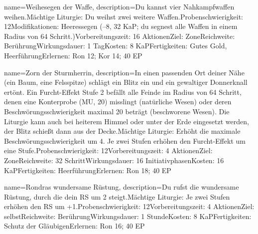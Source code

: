 {
    name={Weihesegen der Waffe},
    description={Du kannst vier Nahkampfwaffen weihen.\newline Mächtige Liturgie: Du weihst zwei weitere Waffen.\newline Probenschwierigkeit: 12\newline Modifikationen: Heeressegen (–8, 32 KaP; du segnest alle Waffen in einem Radius von 64 Schritt.)\newline Vorbereitungszeit: 16 Aktionen\newline Ziel: Zone\newline Reichweite: Berührung\newline Wirkungsdauer: 1 Tag\newline Kosten: 8 KaP\newline Fertigkeiten: Gutes Gold, Heerführung\newline Erlernen: Ron 12; Kor 14; 40 EP}
}


{
    name={Zorn der Sturmherrin},
    description={In einen passenden Ort deiner Nähe (ein Baum, eine Felsspitze) schlägt ein Blitz ein und ein gewaltiger Donnerknall ertönt. Ein Furcht-Effekt Stufe 2 befällt alle Feinde im Radius von 64 Schritt, denen eine Konterprobe (MU, 20) misslingt (natürliche Wesen) oder deren Beschwörungsschwierigkeit maximal 20 beträgt (beschworene Wesen). Die Liturgie kann auch bei heiterem Himmel oder unter der Erde eingesetzt werden, der Blitz schießt dann aus der Decke.\newline Mächtige Liturgie: Erhöht die maximale Beschwörungsschwierigkeit um 4. Je zwei Stufen erhöhen den Furcht-Effekt um eine Stufe.\newline Probenschwierigkeit: 12\newline Vorbereitungszeit: 4 Aktionen\newline Ziel: Zone\newline Reichweite: 32 Schritt\newline Wirkungsdauer: 16 Initiativphasen\newline Kosten: 16 KaP\newline Fertigkeiten: Heerführung\newline Erlernen: Ron 18; 40 EP}
}


{
    name={Rondras wundersame Rüstung},
    description={Du rufst die wundersame Rüstung, durch die dein RS um 2 steigt.\newline Mächtige Liturgie: Je zwei Stufen erhöhen den RS um +1.\newline Probenschwierigkeit: 12\newline Vorbereitungszeit: 4 Aktionen\newline Ziel: selbst\newline Reichweite: Berührung\newline Wirkungsdauer: 1 Stunde\newline Kosten: 8 KaP\newline Fertigkeiten: Schutz der Gläubigen\newline Erlernen: Ron 16; 40 EP}
}


